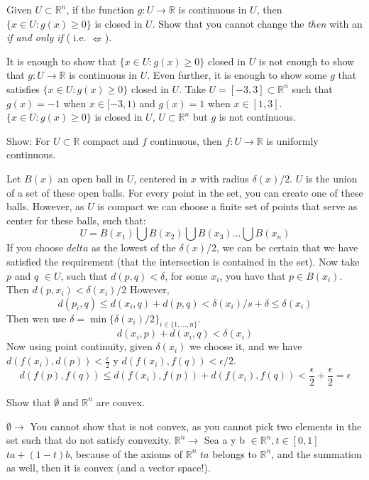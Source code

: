 \documentclass[answers]{exam}
\theoremstyle{definition}
\begin{document}
\begin{questions}
    \question Given $U\subset\mathds{R}^n$, if the function $g:U\rightarrow\mathds{R}$ is continuous in $U$, then $\{x\in U: g(x)\geq0\}$ is closed in $U$. Show that you cannot change the \emph{then} with an \emph{if and only if} ( i.e. $\nLeftarrow$).
    \begin{solution}
        It is enough to show that $\{x\in U: g(x)\geq0\}$ closed in $U$ is not enough to show that $g:U\rightarrow\mathds{R}$ is continuous in $U$.
        Even further, it is enough to show some $g$ that satisfies $\{x\in U: g(x)\geq0\}$ closed in $U$.
        Take $U=[-3,3]\subset \mathds{R}^n$ such that $g(x)=-1$ when $x\in[-3,1)$ and $g(x)=1$ when $x\in[1,3]$. $\{x\in U: g(x)\geq0\}$ is closed in $U$, $U\subset\mathds{R}^n$ but $g$ is not continuous.
    \end{solution}

    \question Show: For $U\subset \mathds{R}$ compact and $f$ continuous, then $f:U\rightarrow\mathds{R}$ is uniformly continuous.
    \begin{solution}
        Let $B(x)$ an open ball in $U$, centered in $x$ with radius $\delta(x)/2$. $U$ is the union of a set of these open balls.
        For every point in the set, you can create one of these balls. However, as $U$ is compact we can choose a finite set of points that serve as center for these balls, such that:
        $$U=B(x_1)\bigcup B(x_2) \bigcup B(x_3)... \bigcup B(x_n)$$
        If you choose $delta$ as the lowest of the $\delta(x)/2$, we can be certain that we have satisfied the requirement (that the intersection is contained in the set).
        Now take $p$ and $q$ $\in U$, such that $d(p,q)<\delta$, for some $x_i$, you have that $p\in B(x_i)$. Then $d(p,x_i)<\delta(x_i)/2$
        However, $$d(p_i,q)\leq d(x_i,q)+d(p,q)<\delta(x_i)/s+\delta\leq \delta(x_i)$$
        Then wen use $\delta=\min\{\delta(x_i)/2\}_{i\in\{1,...,n\}}$.
        $$d(x_i,p)+d(x_i,q)<\delta(x_i)$$
        Now using point continuity, given $\delta(x_i)$ we choose it, and we have $d(f(x_i),d(p))<\frac{\epsilon}{2}$ y $d(f(x_i),f(q))<\epsilon/2$. $$d(f(p),f(q))\leq d(f(x_i),f(p))+d(f(x_i),f(q))<\frac{\epsilon}{2}+\frac{\epsilon}{2}=\epsilon$$
    \end{solution}

\question Show that $\emptyset$ and $\mathds{R}^n$ are convex.
    \begin{solution}
    $\emptyset\rightarrow$ You cannot show that is not convex, as you cannot pick two elements in the set such that do not satisfy convexity.
    $\mathds{R}^n\rightarrow$ Sea a y b $\in \mathds{R}^n, t\in[0,1]$
    $ta+(1-t)b$, because of the axioms of $\mathds{R}^n$ $ta$ belongs to $\mathds{R}^n$, and the summation as well, then it is convex (and a vector space!).
    \end{solution}


\end{questions}
\end{document}
